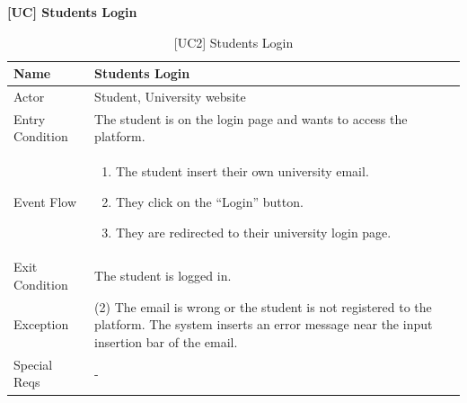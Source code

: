 \textbf{[UC\nextUseCases] Students Login}
\begin{table}[H] %
    \centering
    \begin{tabular}{|p{3cm}|p{10cm}|} 
    \hline
    Name & Students Login \\ \hline
    Actor  & Student, University website\\ \hline
    Entry Condition  & The student is on the login page and wants to access the platform. \\ \hline
    Event Flow  & 
    \begin{enumerate}[noitemsep, topsep=0pt]
        \item The student insert their own university email.
        \item They click on the “Login” button.
        \item They are redirected to their university login page.
    \end{enumerate} \\ \hline
    Exit Condition  & The student is logged in. \\ \hline
    Exception  & (2) The email is wrong or the student is not registered to the platform. The system inserts an error message near the input insertion bar of the email. \\ \hline
    Special Reqs  & - \\ \hline
    \end{tabular}
    \caption{[UC2] Students Login}
\end{table}

